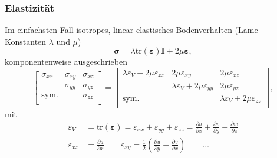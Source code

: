 \documentclass[hyperref={pdfpagemode=FullScreen, colorlinks=false}]{beamer}
\begin{document}
\begin{frame}
\frametitle{Elastizität}
Im einfachsten Fall isotropes, linear elastisches Bodenverhalten
(Lame Konstanten $\lambda$ und $\mu$)
\begin{equation*}
 \boldsymbol{\sigma} = \lambda \mathrm{tr}(\boldsymbol{\varepsilon})\mathbf{I} + 2\mu \boldsymbol{\varepsilon},
\end{equation*}
komponentenweise ausgeschrieben
\begin{equation*}
\left[\begin{array}{ccc}
        \sigma_{xx} & \sigma_{xy} & \sigma_{xz} \\
         & \sigma_{yy} & \sigma_{yz} \\
        \mathrm{sym.} &  & \sigma_{zz} \\
\end{array}\right]
=
\left[\begin{array}{ccc}
        \lambda\varepsilon_V+2\mu\varepsilon_{xx} & 2\mu\varepsilon_{xy} & 2\mu\varepsilon_{xz} \\
         & \lambda\varepsilon_V+ 2\mu\varepsilon_{yy} & 2\mu\varepsilon_{yz} \\
        \mathrm{sym.} &  & \lambda\varepsilon_V+ 2\mu\varepsilon_{zz} \\
\end{array}\right],
\end{equation*}
mit 
\begin{align*}
 \varepsilon_V &=\mathrm{tr}(\boldsymbol{\varepsilon})=\varepsilon_{xx}+\varepsilon_{yy}+\varepsilon_{zz}=\frac{\partial u}{\partial x}+\frac{\partial v}{\partial y}+\frac{\partial w}{\partial z} \\
 \varepsilon_{xx} &= \frac{\partial u}{\partial x} \qquad
 \varepsilon_{xy} = \frac{1}{2} \left( \frac{\partial u}{\partial y} + \frac{\partial v}{\partial x} \right) \qquad
 \dots
\end{align*}
\end{frame}
\end{document}

